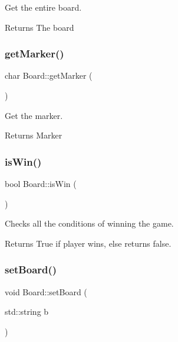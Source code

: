 Get the entire board. 

\begin{DoxyReturn}{Returns}
The board 
\end{DoxyReturn}
\mbox{\label{classBoard_a735a4eec8098cf419441ebb7e4b4fa16}} 
\subsubsection{\texorpdfstring{get\+Marker()}{getMarker()}}
{\footnotesize\ttfamily char Board\+::get\+Marker (\begin{DoxyParamCaption}{ }\end{DoxyParamCaption})}



Get the marker. 

\begin{DoxyReturn}{Returns}
Marker 
\end{DoxyReturn}
\mbox{\label{classBoard_ae59ed3d0322d92f9d9ae3ee6652e7268}} 
\subsubsection{\texorpdfstring{is\+Win()}{isWin()}}
{\footnotesize\ttfamily bool Board\+::is\+Win (\begin{DoxyParamCaption}{ }\end{DoxyParamCaption})\hspace{0.3cm}{\ttfamily [virtual]}}



Checks all the conditions of winning the game. 

\begin{DoxyReturn}{Returns}
True if player wins, else returns false. 
\end{DoxyReturn}
\mbox{\label{classBoard_a47d1cea73ebf03e59b09d1134348c377}} 
\subsubsection{\texorpdfstring{set\+Board()}{setBoard()}}
{\footnotesize\ttfamily void Board\+::set\+Board (\begin{DoxyParamCaption}\item[{std\+::string}]{b }\end{DoxyParamCaption})}



